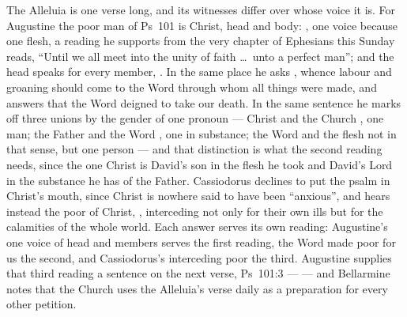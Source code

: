 The Alleluia is one verse long, and its witnesses differ over whose voice it
is. For Augustine the poor man of Ps~101 is Christ, head and body:
, one voice because one flesh, a reading he
supports from the very chapter of Ephesians this Sunday reads, ``Until we all
meet into the unity of faith \dots\ unto a perfect man''; and the head speaks
for every member, .
In the same place he asks , whence labour and groaning should come to the Word through
whom all things were made, and answers that the Word deigned to take our death.
In the same sentence he marks off three unions by the gender of one pronoun
--- Christ and the Church , one man; the Father and the Word
, one in substance; the Word and the flesh not  in that
sense, but one person --- and that distinction is what the second reading needs, since the one Christ is David's son in the flesh he took and
David's Lord in the substance he has of the Father.
Cassiodorus declines to put the psalm in Christ's mouth, since Christ is
nowhere said to have been ``anxious'', and hears instead the poor of Christ, , interceding not only for their own ills but for the calamities
of the whole world. Each answer serves its own reading: Augustine's one voice
of head and members serves the first reading,
the Word made poor for us the second, and Cassiodorus's interceding
poor the third.
Augustine supplies that third reading a sentence on the next verse, Ps~101:3
---\,\,--- and Bellarmine notes that the Church uses the Alleluia's verse daily as a
preparation for every other petition.

